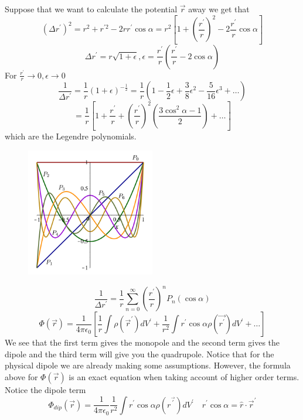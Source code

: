 Suppose that we want to calculate the potential \(\vec{r} \) away we get that 
\[
    (\Delta r^{\prime} )^{2} = r^{2} +r^{\prime 2} - 2r r^{\prime}  \cos \alpha = r^{2}  \left[  1+ \left( \frac{r^{\prime} }{r} \right) ^{2} - 2 \frac{r^{\prime} }{r} \cos \alpha \right] 
\]
\[
    \Delta r^{\prime}  = r \sqrt{ 1 + \epsilon }, \epsilon  = \frac{r^{\prime} }{r} \left(  \frac{r^{\prime} }{r} - 2 \cos \alpha \right)  
\]
For \(\frac{r^{\prime} }{r} \to  0, \epsilon  \to  0\)
\[
    \frac{1}{\Delta r^{\prime} } = \frac{1}{r} (1+\epsilon )^{-\frac{1}{2}} = \frac{1}{r} \left( 
        1- \frac{1}{2}\epsilon  + \frac{3}{8}\epsilon ^{2}  - \frac{5}{16} \epsilon ^{3}  + \dots 
     \right)  
\] 
\[
     = \frac{1}{r} \left[  1 + \frac{r^{\prime} }{r} + \left( \frac{r^{\prime} }{r} \right) ^{2} \left(  \frac{3\cos ^{2} \alpha - 1}{2} \right) + \dots  \right] 
\]
which are the Legendre polynomials. 
\begin{figure}[H]
    \centering
    \includegraphics[width=0.5\textwidth]{Figures/07.png}
    \caption{}
    \label{fig:}
\end{figure}
\[
    \frac{1}{\Delta r^{\prime} } = \frac{1}{r} \sum_{n=0}^{\infty} \left(  \frac{r^{\prime} }{r} \right)^n P_n (\cos \alpha) 
\]
\[
    \Phi (\vec{r} ) = \frac{1}{4\pi \epsilon _0} \left[  \frac{1}{r} \int  \rho (\vec{r} ^{\prime} )  dV^{\prime}  + \frac{1}{r^{2}}  \int  r^{\prime}  \cos \alpha \rho (\vec{r ^{\prime} } ) dV^{\prime} +\dots \right] 
\]
We see that the first term gives the monopole and the second term gives the dipole and the third term will give you the quadrupole. Notice that for the physical dipole we are already making some assumptions. However, the formula above for 
\(\Phi (\vec{r} )\) is an exact equation when taking account of higher order terms. Notice the dipole term
\[
    \Phi_{dip} (\vec{r} ) = \frac{1}{4\pi \epsilon _0 } \frac{1}{r^{2} } \int  r^{\prime}  \cos \alpha \rho (r^{\vec{\prime}} ) dV^{\prime} \quad r^{\prime} \cos \alpha = \hat{r} \cdot \vec{r}^{\prime} 
\]
